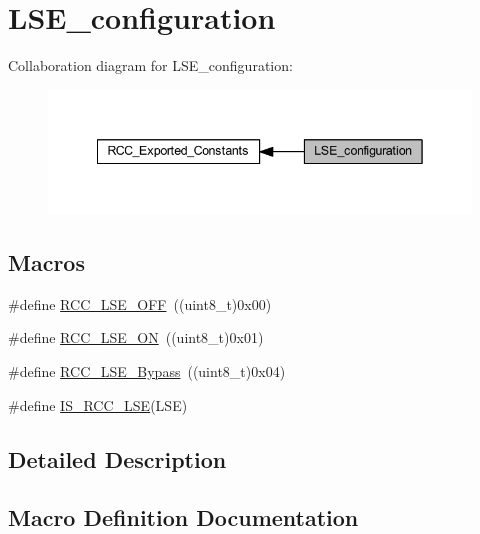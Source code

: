 \hypertarget{group___l_s_e__configuration}{}\section{L\+S\+E\+\_\+configuration}
\label{group___l_s_e__configuration}
Collaboration diagram for L\+S\+E\+\_\+configuration\+:
\nopagebreak
\begin{figure}[H]
\begin{center}
\leavevmode
\includegraphics[width=342pt]{group___l_s_e__configuration}
\end{center}
\end{figure}
\subsection*{Macros}
\begin{DoxyCompactItemize}
\item 
\#define \hyperlink{group___l_s_e__configuration_ga6645c27708d0cad1a4ab61d2abb24c77}{R\+C\+C\+\_\+\+L\+S\+E\+\_\+\+O\+FF}~((uint8\+\_\+t)0x00)
\item 
\#define \hyperlink{group___l_s_e__configuration_gac981ea636c2f215e4473901e0912f55a}{R\+C\+C\+\_\+\+L\+S\+E\+\_\+\+ON}~((uint8\+\_\+t)0x01)
\item 
\#define \hyperlink{group___l_s_e__configuration_gac911af00bffa1bd1b1676f582a8a88e1}{R\+C\+C\+\_\+\+L\+S\+E\+\_\+\+Bypass}~((uint8\+\_\+t)0x04)
\item 
\#define \hyperlink{group___l_s_e__configuration_ga95d2678bf8f46e932e7cba75619a4d2c}{I\+S\+\_\+\+R\+C\+C\+\_\+\+L\+SE}(L\+SE)
\end{DoxyCompactItemize}


\subsection{Detailed Description}


\subsection{Macro Definition Documentation}
\mbox{\label{group___l_s_e__configuration_ga95d2678bf8f46e932e7cba75619a4d2c}} 
